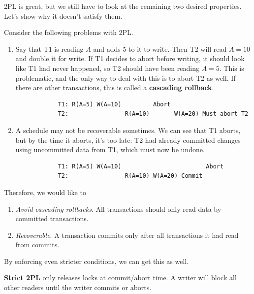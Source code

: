     2PL is great, but we still have to look at the remaining two desired properties. Let's show why it doesn't satisfy them. 

    \begin{example}
      Consider the following problems with 2PL.  
      \begin{enumerate}
        \item Say that T1 is reading $A$ and adds 5 to it to write. Then T2 will read $A=10$ and double it for write. If T1 decides to abort before writing, it should look like T1 had never happened, so T2 should have been reading $A=5$. This is problematic, and the only way to deal with this is to abort T2 as well. If there are other transactions, this is called a \textbf{cascading rollback}. 
          \begin{lstlisting}
            T1: R(A=5) W(A=10)         Abort 
            T2:                R(A=10)       W(A=20) Must abort T2
          \end{lstlisting}

        \item A schedule may not be recoverable sometimes. We can see that T1 aborts, but by the time it aborts, it's too late: T2 had already committed changes using uncommitted data from T1, which must now be undone. 
          \begin{lstlisting}
            T1: R(A=5) W(A=10)                        Abort
            T2:                R(A=10) W(A=20) Commit
          \end{lstlisting}
      \end{enumerate}
    \end{example}

    Therefore, we would like to 
    \begin{enumerate}
      \item \textit{Avoid cascading rollbacks}. All transactions should only read data by committed transactions. 
      \item \textit{Recoverable}. A transaction commits only after all transactions it had read from commits. 
    \end{enumerate} 
    By enforcing even stricter conditions, we can get this as well. 

    \begin{definition}[Strict 2PL]
      \textbf{Strict 2PL} only releases locks at commit/abort time. A writer will block all other readers until the writer commits or aborts.
    \end{definition}

